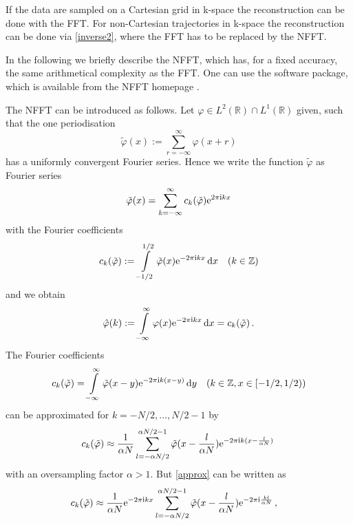 \documentclass[journal]{IEEEtran}
\def\ti{\mbox{\scriptsize{\rm i}}}
\newcommand{\eip}[1]{{\rm e}^{ 2\pi{\ti} #1}}
\newcommand{\eim}[1]{{\rm e}^{-2\pi{\ti} #1}}
\renewcommand{\d}{{\rm d}}
\numberwithin{equation}{section}
\numberwithin{table}{section}
\numberwithin{figure}{section}
\begin{document}
If the data are sampled on a Cartesian grid in k-space the
reconstruction can be done with the FFT. For non-Cartesian
trajectories in k-space the reconstruction can be done via
\eqref{inverse2}, where the FFT has to be replaced by the NFFT.

In the following we briefly describe the NFFT, which has, for a fixed accuracy,
the same arithmetical complexity as the FFT. One can use the
software package, which is available from the NFFT homepage \cite{kupo02C}.

The NFFT can be introduced as follows. 
Let $\varphi\in L^2(\mathbb{R})\cap L^1(\mathbb{R}) $ given, such that
the one periodisation
\begin{equation} \label{phiper}
\tilde\varphi(x) :=  \sum_{r=-\infty}^{\infty} \varphi(x+r)
\end{equation} 
has a uniformly convergent Fourier series.
Hence we write the function $\tilde\varphi$ as Fourier series 
\begin{equation} \label{FRphi}
\tilde\varphi (x) =  \sum_{ k=-\infty }^{\infty}  c_{k}(\tilde\varphi)  
\eip{ k x} 
\end{equation} 
with the Fourier coefficients 
\begin{equation} \label{FKphi}
c_{ k} (\tilde \varphi ) :=  
\int\limits_{-1/2}^{1/2} \tilde\varphi ( x)
  \eim{ kx} \, {\rm d} {x} \quad ( k \in \mathbb{Z}) 
\end{equation}
and we obtain 
\begin{equation}\label{FK=ck}
\hat\varphi(k) := \int\limits_{-\infty}^{\infty} \varphi ( x)
  \eim{ k x} \, \d { x} = c_{ k} (\tilde \varphi )\, .
\end{equation}
The Fourier coefficients
\begin{equation} \label{FKphi}
c_{ k} (\tilde \varphi ) =  
\int\limits_{-\infty}^{\infty} \tilde\varphi (x-y)
  \eim{ k(x-y)} \, {\rm d} {y} \quad ( k \in \mathbb{Z}, x\in[-1/2,1/2)) 
\end{equation}
can be approximated for $k=-N/2,\ldots, N/2-1$ by
\begin{equation} \label{approx}
c_{ k} (\tilde \varphi ) \approx
\frac{1}{\alpha N} \sum_{l=-\alpha N/2}^{\alpha N/2-1}
\tilde\varphi (x-\frac{l}{\alpha N})  \eim{ k(x-\frac{l}{\alpha N})} \,
\end{equation}
with an oversampling factor $\alpha >1$.
But \eqref{approx} can be written as
\[
c_{ k} (\tilde \varphi ) \approx
\frac{1}{\alpha N}\eim{kx}
\sum_{l=-\alpha N/2}^{\alpha N/2-1}
\tilde\varphi (x-\frac{l}{\alpha N})  \eim{\frac{kl}{\alpha N}} \,,\quad
\]
\end{document}
